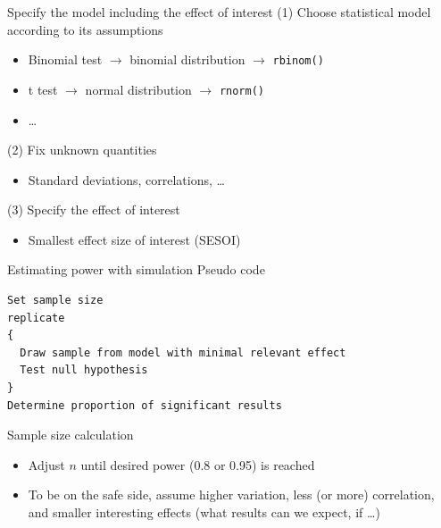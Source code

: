 \documentclass[aspectratio=169]{beamer}
\begin{document}
\begin{frame}{Specify the model including the effect of interest}
(1) Choose statistical model according to its assumptions
  \begin{itemize}
    \item Binomial test $\to$ binomial distribution $\to$ \texttt{rbinom()}
    \item t test $\to$ normal distribution $\to$ \texttt{rnorm()}
    \item \dots
  \end{itemize}
(2) Fix unknown quantities
  \begin{itemize}
    \item Standard deviations, correlations, \dots
  \end{itemize}
(3) Specify the effect of interest
  \begin{itemize}
    \item Smallest effect size of interest (SESOI)
  \end{itemize}
\end{frame}

\begin{frame}[fragile]{Estimating power with simulation}
  {Pseudo code}
\begin{lstlisting}[style=plain, frame=single]
Set sample size
replicate
{
  Draw sample from model with minimal relevant effect
  Test null hypothesis
}
Determine proportion of significant results
\end{lstlisting}
Sample size calculation
  \begin{itemize}
    \item Adjust $n$ until desired power (0.8 or 0.95) is reached
    \item To be on the safe side, assume higher variation, less (or more)
      correlation, and smaller interesting effects (what results can we
      expect, if \dots)
  \end{itemize}
\end{frame}
\end{document}
